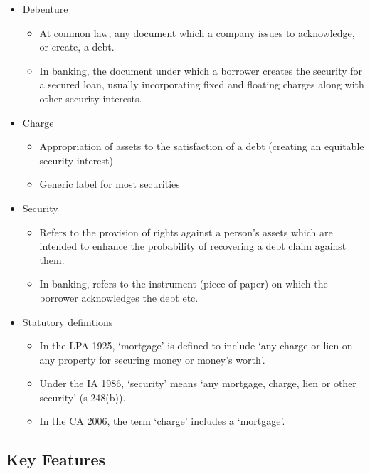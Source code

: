 \documentclass[
]{article}
\providecommand{\tightlist}{%
  \setlength{\itemsep}{0pt}\setlength{\parskip}{0pt}}
\begin{document}
\begin{itemize}
\tightlist
\item
  Debenture

  \begin{itemize}
  \tightlist
  \item
    At common law, any document which a company issues to acknowledge,
    or create, a debt.
  \item
    In banking, the document under which a borrower creates the security
    for a secured loan, usually incorporating fixed and floating charges
    along with other security interests.
  \end{itemize}
\item
  Charge

  \begin{itemize}
  \tightlist
  \item
    Appropriation of assets to the satisfaction of a debt (creating an
    equitable security interest)
  \item
    Generic label for most securities
  \end{itemize}
\item
  Security

  \begin{itemize}
  \tightlist
  \item
    Refers to the provision of rights against a person's assets which
    are intended to enhance the probability of recovering a debt claim
    against them.
  \item
    In banking, refers to the instrument (piece of paper) on which the
    borrower acknowledges the debt etc.
  \end{itemize}
\item
  Statutory definitions

  \begin{itemize}
  \tightlist
  \item
    In the LPA 1925, `mortgage' is defined to include `any charge or
    lien on any property for securing money or money's worth'.
  \item
    Under the IA 1986, `security' means `any mortgage, charge, lien or
    other security' (s 248(b)).
  \item
    In the CA 2006, the term `charge' includes a `mortgage'.
  \end{itemize}
\end{itemize}

\hypertarget{key-features}{%
\subsection{Key Features}\label{key-features}}
\end{document}

